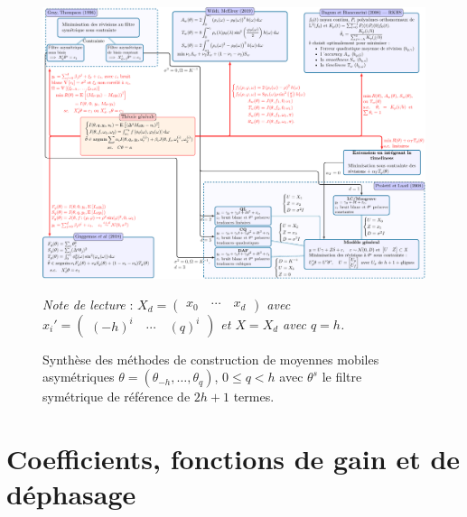 \documentclass[
  11pt,
  french,
  a4paper]{article}
\newcommand\1{\mathds{1}}
\begin{document}
\begin{figure}

{\centering \includegraphics[width=0.9\textheight,angle=90]{img/bookdown/pdf/diag-gen-asym-1} 

}

\caption[Synthèse des méthodes de construction de moyennes mobiles asymétriques \(\theta=(\theta_{-h},\dots,\theta_{q})\), \(0\leq q< h\) avec \(\theta^s\) le filtre symétrique de référence de \(2h+1\) termes]{Synthèse des méthodes de construction de moyennes mobiles asymétriques \(\theta=(\theta_{-h},\dots,\theta_{q})\), \(0\leq q< h\) avec \(\theta^s\) le filtre symétrique de référence de \(2h+1\) termes.}\label{fig:diag-gen-asym}

\footnotesize


\emph{Note de lecture} : \emph{\(X_d = \begin{pmatrix} x_0 \quad\cdots \quad x_d \end{pmatrix}\) avec \(x_i'=\begin{pmatrix} (-h)^i \quad \cdots \quad (q)^i\end{pmatrix}\) et \(X=X_d\) avec \(q=h\).}
\normalsize\end{figure}

\newpage

\hypertarget{an-graphs}{%
\section{Coefficients, fonctions de gain et de déphasage}\label{an-graphs}}
\end{document}
